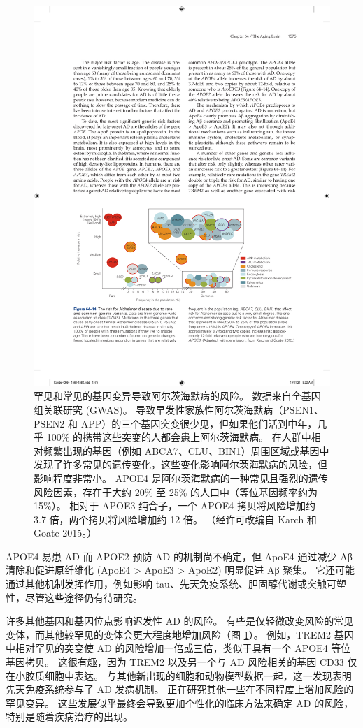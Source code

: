 \begin{figure}[htbp]
	\centering
	\includegraphics[width=0.9\linewidth]{chap64/fig_64_14}
	\caption{罕见和常见的基因变异导致阿尔茨海默病的风险。 数据来自全基因组关联研究 (GWAS)。 导致早发性家族性阿尔茨海默病（PSEN1、PSEN2 和 APP）的三个基因突变很少见，但如果他们活到中年，几乎 100\% 的携带这些突变的人都会患上阿尔茨海默病。 在人群中相对频繁出现的基因（例如 ABCA7、CLU、BIN1）周围区域或基因中发现了许多常见的遗传变化，这些变化影响阿尔茨海默病的风险，但影响程度非常小。 APOE4 是阿尔茨海默病的一种常见且强烈的遗传风险因素，存在于大约 20\% 至 25\% 的人口中（等位基因频率约为 15\%）。 相对于 APOE3 纯合子，一个 APOE4 拷贝将风险增加约 3.7 倍，两个拷贝将风险增加约 12 倍。 （经许可改编自 Karch 和 Goate 2015。）}
	\label{fig:64_14}
\end{figure}


APOE4 易患 AD 而 APOE2 预防 AD 的机制尚不确定，但 ApoE4 通过减少 Aβ 清除和促进原纤维化 (ApoE4 > ApoE3 > ApoE2) 明显促进 Aβ 聚集。
它还可能通过其他机制发挥作用，例如影响 tau、先天免疫系统、胆固醇代谢或突触可塑性，尽管这些途径仍有待研究。


许多其他基因和基因位点影响迟发性 AD 的风险。
有些是仅轻微改变风险的常见变体，而其他较罕见的变体会更大程度地增加风险（图 \ref{fig:64_14}）。
例如，TREM2 基因中相对罕见的突变使 AD 的风险增加一倍或三倍，类似于具有一个 APOE4 等位基因拷贝。
这很有趣，因为 TREM2 以及另一个与 AD 风险相关的基因 CD33 仅在小胶质细胞中表达。
与其他新出现的细胞和动物模型数据一起，这一发现表明先天免疫系统参与了 AD 发病机制。
正在研究其他一些在不同程度上增加风险的罕见变异。
这些发展似乎最终会导致更加个性化的临床方法来确定 AD 的风险，特别是随着疾病治疗的出现。



